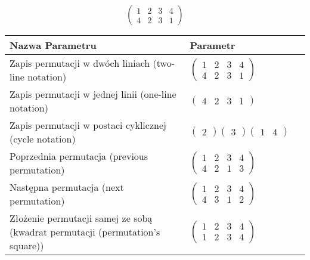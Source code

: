 \documentclass[12pt]{article}
\begin{document}
\subsection{}
\begin{center}
\[
\begin{pmatrix}
	1 & 2 & 3 & 4 \\ 
	4 & 2 & 3 & 1 
\end{pmatrix}
\]

\begin{tabular}{|m{0.6\linewidth}|m{0.4\linewidth}|}
	\hline
	Nazwa Parametru & Parametr \\
	\hline
	Zapis permutacji w dwóch liniach (two-line notation) & $\begin{pmatrix} 1 & 2 & 3 & 4 \\ 
4 & 2 & 3 & 1 \end{pmatrix}$ \\ 
	\hline
	Zapis permutacji w jednej linii (one-line notation) & $\begin{pmatrix} 4 & 2 & 3 & 1 \end{pmatrix}$ \\ 
	\hline
	Zapis permutacji w postaci cyklicznej (cycle notation) & $\begin{pmatrix} 2 \end{pmatrix} \begin{pmatrix} 3 \end{pmatrix} \begin{pmatrix} 1 & 4 \end{pmatrix} $ \\ 
	\hline
	Poprzednia permutacja (previous permutation) & $\begin{pmatrix} 1 & 2 & 3 & 4 \\ 
4 & 2 & 1 & 3 \end{pmatrix}$ \\ 
	\hline
	Następna permutacja (next permutation) & $\begin{pmatrix} 1 & 2 & 3 & 4 \\ 
4 & 3 & 1 & 2 \end{pmatrix}$ \\ 
	\hline
	Złożenie permutacji samej ze sobą (kwadrat permutacji (permutation's square)) & $\begin{pmatrix} 1 & 2 & 3 & 4 \\ 
1 & 2 & 3 & 4 \end{pmatrix}$ \\ 
	\hline
\end{tabular}
\end{center}
\end{document}

